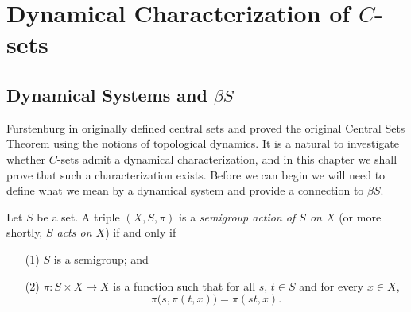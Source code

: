 
\newcommand{\ds}{(X, \la T_s \ra_{s \in S})}
\chapter{Dynamical Characterization of $C$-sets}
\section{Dynamical Systems and $\beta S$}
Furstenburg in \cite[Chapter 8]{Furstenberg:1981fk} originally defined central sets and proved the original Central Sets Theorem using the notions of topological dynamics.%
It is a natural to investigate whether $C$-sets admit a dynamical characterization, and in this chapter we shall prove that such a characterization exists.
Before we can begin we will need to define what we mean by a dynamical
system and provide a connection to $\beta S$.
  \begin{defn}
    \label{defn:semiact}
    Let $S$ be a set. 
    A triple $(X, S, \pi)$ is a \textsl{semigroup action of $S$ on
      $X$} (or more shortly, \textsl{$S$ acts on $X$}) if and only if 
      \begin{itemize}
        \item[(1)] $S$ is a semigroup; and
        
        \item[(2)] $\pi : S \times X \to X$ is a function%
 such that
          for all $s$, $t \in S$ and for every $x \in X$,
          \[ \pi\bigl(s, \pi(t,x)\bigr) = \pi(st, x). \]
          
      \end{itemize}
  \end{defn}
  

